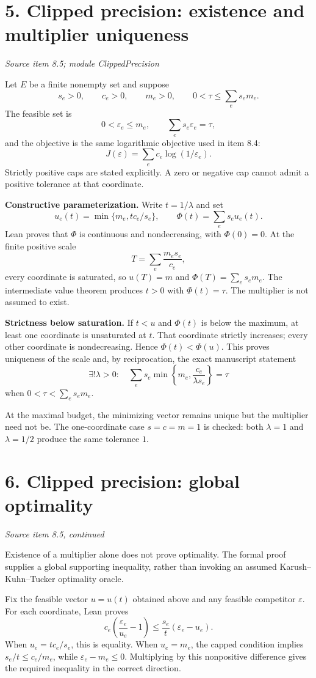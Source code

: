 \documentclass[11pt]{article}
\newcommand{\pageheading}[2]{\section*{\color{ink}#1}\textit{#2}\par}
\begin{document}
\newpage
\pageheading{5. Clipped precision: existence and multiplier uniqueness}{Source item 8.5; module ClippedPrecision}
Let $E$ be a finite nonempty set and suppose
\[
s_e>0,\qquad c_e>0,\qquad m_e>0,
\qquad 0<\tau\le\sum_e s_em_e.
\]
The feasible set is
\[
0<\varepsilon_e\le m_e,\qquad \sum_e s_e\varepsilon_e=\tau,
\]
and the objective is the same logarithmic objective used in item 8.4:
\[
J(\varepsilon)=\sum_e c_e\log(1/\varepsilon_e).
\]
Strictly positive caps are stated explicitly. A zero or negative cap cannot admit a positive tolerance at that coordinate.

\textbf{Constructive parameterization.} Write $t=1/\lambda$ and set
\[
u_e(t)=\min\{m_e,tc_e/s_e\},\qquad
\Phi(t)=\sum_e s_eu_e(t).
\]
Lean proves that $\Phi$ is continuous and nondecreasing, with $\Phi(0)=0$. At the finite positive scale
\[
T=\sum_e\frac{m_es_e}{c_e},
\]
every coordinate is saturated, so $u(T)=m$ and $\Phi(T)=\sum_es_em_e$. The intermediate value theorem produces $t>0$ with $\Phi(t)=\tau$. The multiplier is not assumed to exist.

\textbf{Strictness below saturation.} If $t<u$ and $\Phi(t)$ is below the maximum, at least one coordinate is unsaturated at $t$. That coordinate strictly increases; every other coordinate is nondecreasing. Hence $\Phi(t)<\Phi(u)$. This proves uniqueness of the scale and, by reciprocation, the exact manuscript statement
\[
\boxed{\exists!\lambda>0:\quad
\sum_e s_e\min\!\left\{m_e,\frac{c_e}{\lambda s_e}\right\}=\tau}
\]
when $0<\tau<\sum_es_em_e$.

At the maximal budget, the minimizing vector remains unique but the multiplier need not be. The one-coordinate case $s=c=m=1$ is checked: both $\lambda=1$ and $\lambda=1/2$ produce the same tolerance $1$.

\newpage
\pageheading{6. Clipped precision: global optimality}{Source item 8.5, continued}
Existence of a multiplier alone does not prove optimality. The formal proof supplies a global supporting inequality, rather than invoking an assumed Karush--Kuhn--Tucker optimality oracle.

Fix the feasible vector $u=u(t)$ obtained above and any feasible competitor $\varepsilon$. For each coordinate, Lean proves
\[
\boxed{
 c_e\left(\frac{\varepsilon_e}{u_e}-1\right)
 \le \frac{s_e}{t}(\varepsilon_e-u_e).
}
\]
When $u_e=tc_e/s_e$, this is equality. When $u_e=m_e$, the capped condition implies $s_e/t\le c_e/m_e$, while $\varepsilon_e-m_e\le0$. Multiplying by this nonpositive difference gives the required inequality in the correct direction.
\end{document}
